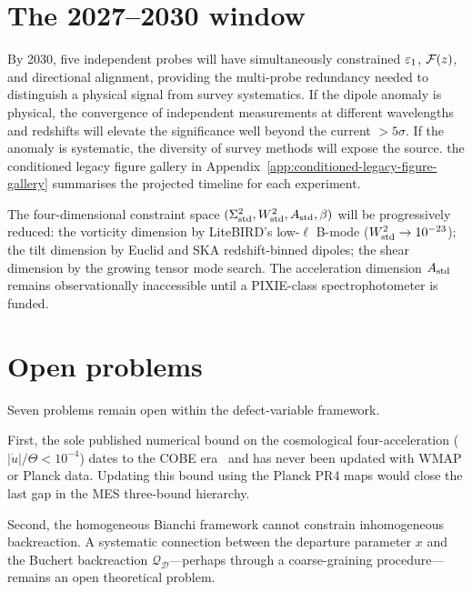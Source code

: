 \section{The 2027--2030 window}\label{sec:window}

By 2030, five independent probes will have simultaneously
constrained $\varepsilon_1$, $\mathcal{F}(z)$, and directional alignment,
providing the multi-probe redundancy needed to distinguish a
physical signal from survey systematics.  If the dipole anomaly
is physical, the convergence of independent measurements at
different wavelengths and redshifts will elevate the significance
well beyond the current $> 5\sigma$.  If the anomaly is
systematic, the diversity of survey methods will expose the
source.  the conditioned legacy figure gallery in Appendix~\ref{app:conditioned-legacy-figure-gallery} summarises the
projected timeline for each experiment.

The four-dimensional constraint space
$(\Sigma^2_{\mathrm{std}}, W^2_{\mathrm{std}}, A_{\mathrm{std}}, \beta)$ will be progressively reduced:
the vorticity dimension by LiteBIRD's low-$\ell$ B-mode
($W^2_{\mathrm{std}} \to 10^{-23}$); the tilt dimension by Euclid and SKA
redshift-binned dipoles; the shear dimension by the growing
tensor mode search.  The acceleration dimension
$A_{\mathrm{std}}$ remains observationally inaccessible until a
PIXIE-class spectrophotometer is funded.


\section{Open problems}\label{sec:open-problems}

Seven problems remain open within the defect-variable framework.

First, the sole published numerical bound on the cosmological
four-acceleration ($|\dot{u}|/\Theta < 10^{-4}$) dates to the
COBE era~\cite{StoegerAG1997} and has never been updated with
WMAP or Planck data.  Updating this bound using the Planck PR4
maps would close the last gap in the MES three-bound hierarchy.

Second, the homogeneous Bianchi framework cannot constrain
inhomogeneous backreaction.  A systematic connection between the
departure parameter $x$ and the Buchert backreaction
$\mathcal{Q}_\mathcal{D}$---perhaps through a coarse-graining
procedure---remains an open theoretical problem.

